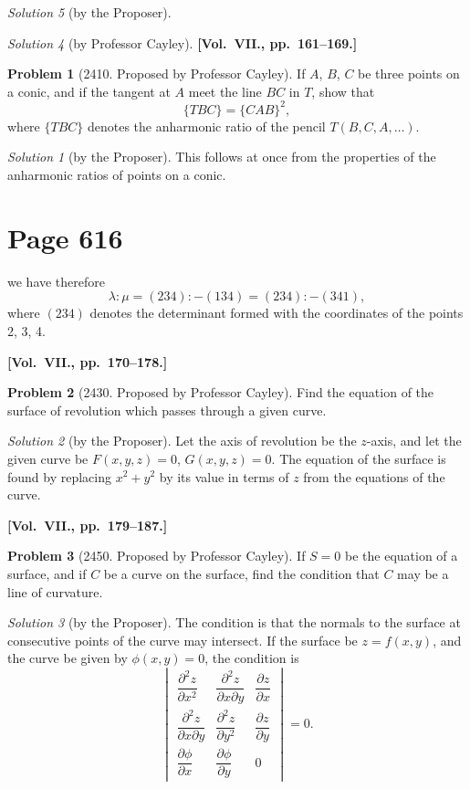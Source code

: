 \documentclass[12pt,a4paper]{article}
\theoremstyle{plain}
\theoremstyle{definition}
\newtheorem{problem}{Problem}
\theoremstyle{remark}
\newtheorem*{solution}{Solution}
\begin{document}
\begin{solution}[by the Proposer]
\begin{solution}[by Professor Cayley]
\medskip\noindent\textbf{[Vol.~VII., pp.~161--169.]}

\begin{problem}[2410. Proposed by Professor Cayley]
If $A$, $B$, $C$ be three points on a conic, and if the tangent at $A$ meet the line $BC$ in $T$, show that
\[
\{TBC\} = \{CAB\}^2,
\]
where $\{TBC\}$ denotes the anharmonic ratio of the pencil $T(B, C, A, \ldots)$.
\end{problem}

\begin{solution}[by the Proposer]
This follows at once from the properties of the anharmonic ratios of points on a conic.
\end{solution}

\section*{Page 616}
\setcounter{page}{616}

we have therefore
\[
\lambda : \mu = (234) : -(134) = (234) : -(341),
\]
where $(234)$ denotes the determinant formed with the coordinates of the points 2, 3, 4.

\medskip\noindent\textbf{[Vol.~VII., pp.~170--178.]}

\begin{problem}[2430. Proposed by Professor Cayley]
Find the equation of the surface of revolution which passes through a given curve.
\end{problem}

\begin{solution}[by the Proposer]
Let the axis of revolution be the $z$-axis, and let the given curve be $F(x, y, z) = 0$, $G(x, y, z) = 0$. The equation of the surface is found by replacing $x^2 + y^2$ by its value in terms of $z$ from the equations of the curve.
\end{solution}

\medskip\noindent\textbf{[Vol.~VII., pp.~179--187.]}

\begin{problem}[2450. Proposed by Professor Cayley]
If $S = 0$ be the equation of a surface, and if $C$ be a curve on the surface, find the condition that $C$ may be a line of curvature.
\end{problem}

\begin{solution}[by the Proposer]
The condition is that the normals to the surface at consecutive points of the curve may intersect. If the surface be $z = f(x, y)$, and the curve be given by $\phi(x, y) = 0$, the condition is
\[
\begin{vmatrix}
\dfrac{\partial^2 z}{\partial x^2} & \dfrac{\partial^2 z}{\partial x\partial y} & \dfrac{\partial z}{\partial x} \\
\dfrac{\partial^2 z}{\partial x\partial y} & \dfrac{\partial^2 z}{\partial y^2} & \dfrac{\partial z}{\partial y} \\
\dfrac{\partial \phi}{\partial x} & \dfrac{\partial \phi}{\partial y} & 0
\end{vmatrix} = 0.
\]
\end{solution}


\end{solution}
\end{solution}
\end{document}

